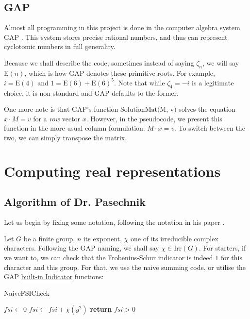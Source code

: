 \documentclass[11pt]{article}
\begin{document}
\subsection{GAP}

Almost all programming in this project is done in the computer algebra system GAP \cite{GAP4}.
This system stores precise rational numbers, and thus can represent cyclotomic numbers in full generality.

Because we shall describe the code, sometimes instead of saying $\zeta_n$, we will say $\text{E}(n)$,
which is how GAP denotes these primitive roots. For example, $i = \text{E}(4)$ and $1 = \text{E}(6) + \text{E}(6)^5$.
Note that while $\zeta_4 = -i$ is a legitimate choice, it is non-standard and GAP defaults to the former.

One more note is that GAP's function $\text{SolutionMat(M, v)}$ solves the equation
$x \cdot M = v$ for a \textit{row} vector $x$. However, in the pseudocode, we present
this function in the more usual column formulation: $M \cdot x = v$. To switch between
the two, we can simply transpose the matrix.
\newpage

\section{Computing real representations}

\subsection{Algorithm of Dr. Pasechnik}

Let us begin by fixing some notation, following the notation in his paper \cite{Pas21}.

Let $G$ be a finite group, $n$ its exponent, $\chi$ one of its irreducible complex characters. 
Following the GAP naming, we shall say $\chi \in \text{Irr}(G)$. For starters, if we want to,
we can check that the Frobenius-Schur indicator is indeed $1$ for this character and this group.
For that, we use the naive summing code, or utilise the GAP
\href{https://docs.gap-system.org/doc/ref/chap71_mj.html#X7FD3D3047DE6381E}{built-in Indicator} functions:

\begin{algorithm}
  \caption{NaiveFSICheck}
  \begin{algorithmic}
    \State $fsi \gets 0$
      \State $fsi \gets fsi + \chi(g^2)$
    \EndFor
    \State \textbf{return} $fsi > 0$
  \end{algorithmic}
\end{algorithm}
\end{document}
